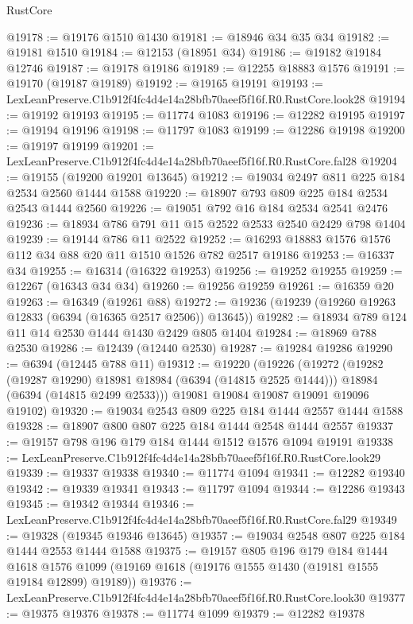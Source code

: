 \begin{lexlean}{RustCore}
\begin{coremodule}
@19178 := @19176 @1510 @1430
@19181 := @18946 @34 @35 @34
@19182 := @19181 @1510
@19184 := @12153 (@18951 @34)
@19186 := @19182 @19184 @12746
@19187 := @19178 @19186
@19189 := @12255 @18883 @1576
@19191 := @19170 (@19187 @19189)
@19192 := @19165 @19191
@19193 := LexLeanPreserve.C1b912f4fc4d4e14a28bfb70aeef5f16f.R0.RustCore.look28
@19194 := @19192 @19193
@19195 := @11774 @1083
@19196 := @12282 @19195
@19197 := @19194 @19196
@19198 := @11797 @1083
@19199 := @12286 @19198
@19200 := @19197 @19199
@19201 := LexLeanPreserve.C1b912f4fc4d4e14a28bfb70aeef5f16f.R0.RustCore.fal28
@19204 := @19155 (@19200 @19201 @13645)
@19212 := @19034 @2497 @811 @225 @184 @2534 @2560 @1444 @1588
@19220 := @18907 @793 @809 @225 @184 @2534 @2543 @1444 @2560
@19226 := @19051 @792 @16 @184 @2534 @2541 @2476
@19236 := @18934 @786 @791 @11 @15 @2522 @2533 @2540 @2429 @798 @1404
@19239 := @19144 @786 @11 @2522
@19252 := @16293 @18883 @1576 @1576 @112 @34 @88 @20 @11 @1510 @1526 @782 @2517 @19186
@19253 := @16337 @34
@19255 := @16314 (@16322 @19253)
@19256 := @19252 @19255
@19259 := @12267 (@16343 @34 @34)
@19260 := @19256 @19259
@19261 := @16359 @20
@19263 := @16349 (@19261 @88)
@19272 := @19236 (@19239 (@19260 @19263 @12833 (@6394 (@16365 @2517 @2506)) @13645))
@19282 := @18934 @789 @124 @11 @14 @2530 @1444 @1430 @2429 @805 @1404
@19284 := @18969 @788 @2530
@19286 := @12439 (@12440 @2530)
@19287 := @19284 @19286
@19290 := @6394 (@12445 @788 @11)
@19312 := @19220
    (@19226
      (@19272
        (@19282 (@19287 @19290) @18981 @18984 (@6394 (@14815 @2525 @1444)))
        @18984
        (@6394 (@14815 @2499 @2533)))
      @19081
      @19084
      @19087
      @19091
      @19096
      @19102)
@19320 := @19034 @2543 @809 @225 @184 @1444 @2557 @1444 @1588
@19328 := @18907 @800 @807 @225 @184 @1444 @2548 @1444 @2557
@19337 := @19157 @798 @196 @179 @184 @1444 @1512 @1576 @1094 @19191
@19338 := LexLeanPreserve.C1b912f4fc4d4e14a28bfb70aeef5f16f.R0.RustCore.look29
@19339 := @19337 @19338
@19340 := @11774 @1094
@19341 := @12282 @19340
@19342 := @19339 @19341
@19343 := @11797 @1094
@19344 := @12286 @19343
@19345 := @19342 @19344
@19346 := LexLeanPreserve.C1b912f4fc4d4e14a28bfb70aeef5f16f.R0.RustCore.fal29
@19349 := @19328 (@19345 @19346 @13645)
@19357 := @19034 @2548 @807 @225 @184 @1444 @2553 @1444 @1588
@19375 := @19157
    @805
    @196
    @179
    @184
    @1444
    @1618
    @1576
    @1099
    (@19169 @1618 (@19176 @1555 @1430 (@19181 @1555 @19184 @12899) @19189))
@19376 := LexLeanPreserve.C1b912f4fc4d4e14a28bfb70aeef5f16f.R0.RustCore.look30
@19377 := @19375 @19376
@19378 := @11774 @1099
@19379 := @12282 @19378

\end{coremodule}
\end{lexlean}

